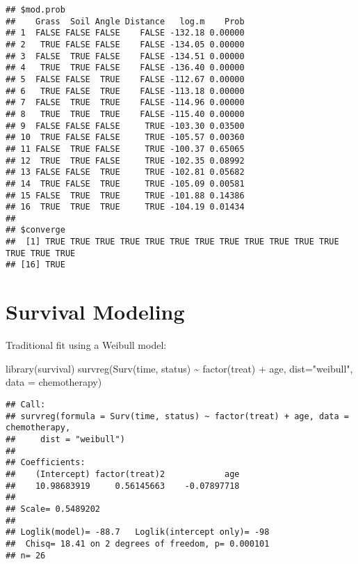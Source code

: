 \documentclass[
]{book}
\newenvironment{Shaded}{\begin{snugshade}}{\end{snugshade}}
\newcommand{\AttributeTok}[1]{\textcolor[rgb]{0.77,0.63,0.00}{#1}}
\newcommand{\FunctionTok}[1]{\textcolor[rgb]{0.00,0.00,0.00}{#1}}
\newcommand{\NormalTok}[1]{#1}
\newcommand{\SpecialCharTok}[1]{\textcolor[rgb]{0.00,0.00,0.00}{#1}}
\newcommand{\StringTok}[1]{\textcolor[rgb]{0.31,0.60,0.02}{#1}}
\begin{document}
\begin{verbatim}
## $mod.prob
##    Grass  Soil Angle Distance   log.m    Prob
## 1  FALSE FALSE FALSE    FALSE -132.18 0.00000
## 2   TRUE FALSE FALSE    FALSE -134.05 0.00000
## 3  FALSE  TRUE FALSE    FALSE -134.51 0.00000
## 4   TRUE  TRUE FALSE    FALSE -136.40 0.00000
## 5  FALSE FALSE  TRUE    FALSE -112.67 0.00000
## 6   TRUE FALSE  TRUE    FALSE -113.18 0.00000
## 7  FALSE  TRUE  TRUE    FALSE -114.96 0.00000
## 8   TRUE  TRUE  TRUE    FALSE -115.40 0.00000
## 9  FALSE FALSE FALSE     TRUE -103.30 0.03500
## 10  TRUE FALSE FALSE     TRUE -105.57 0.00360
## 11 FALSE  TRUE FALSE     TRUE -100.37 0.65065
## 12  TRUE  TRUE FALSE     TRUE -102.35 0.08992
## 13 FALSE FALSE  TRUE     TRUE -102.81 0.05682
## 14  TRUE FALSE  TRUE     TRUE -105.09 0.00581
## 15 FALSE  TRUE  TRUE     TRUE -101.88 0.14386
## 16  TRUE  TRUE  TRUE     TRUE -104.19 0.01434
## 
## $converge
##  [1] TRUE TRUE TRUE TRUE TRUE TRUE TRUE TRUE TRUE TRUE TRUE TRUE TRUE TRUE TRUE
## [16] TRUE
\end{verbatim}

\hypertarget{survival-modeling}{%
\section{Survival Modeling}\label{survival-modeling}}

Traditional fit using a Weibull model:

\begin{Shaded}
\begin{Highlighting}[]
\FunctionTok{library}\NormalTok{(survival)}
\FunctionTok{survreg}\NormalTok{(}\FunctionTok{Surv}\NormalTok{(time, status) }\SpecialCharTok{\textasciitilde{}} \FunctionTok{factor}\NormalTok{(treat) }\SpecialCharTok{+}\NormalTok{ age,}
        \AttributeTok{dist=}\StringTok{"weibull"}\NormalTok{,}
        \AttributeTok{data =}\NormalTok{ chemotherapy)}
\end{Highlighting}
\end{Shaded}

\begin{verbatim}
## Call:
## survreg(formula = Surv(time, status) ~ factor(treat) + age, data = chemotherapy, 
##     dist = "weibull")
## 
## Coefficients:
##    (Intercept) factor(treat)2            age 
##    10.98683919     0.56145663    -0.07897718 
## 
## Scale= 0.5489202 
## 
## Loglik(model)= -88.7   Loglik(intercept only)= -98
##  Chisq= 18.41 on 2 degrees of freedom, p= 0.000101 
## n= 26
\end{verbatim}
\end{document}
